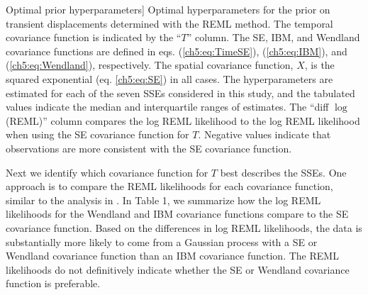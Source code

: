 \begin{table}\label{ch5:tab:Parameters}
\caption
[Optimal prior hyperparameters]
{Optimal hyperparameters for the prior on transient
displacements determined with the REML method. The temporal covariance
function is indicated by the ``$T$'' column. The SE, IBM, and Wendland
covariance functions are defined in eqs. (\ref{ch5:eq:TimeSE}),
(\ref{ch5:eq:IBM}), and (\ref{ch5:eq:Wendland}), respectively. The
spatial covariance function, $X$, is the squared exponential (eq.
\ref{ch5:eq:SE}) in all cases. The hyperparameters are estimated for
each of the seven SSEs considered in this study, and the tabulated
values indicate the median and interquartile ranges of estimates. The
``diff $\log$(REML)'' column compares the log REML likelihood to the
log REML likelihood when using the SE covariance function for $T$.
Negative values indicate that observations are more consistent with
the SE covariance function.}
\end{table}

Next we identify which covariance function for $T$ best describes the
SSEs. One approach is to compare the REML likelihoods for each
covariance function, similar to the analysis in \citet{Langbein2004}.
In Table 1, we summarize how the log REML likelihoods for the Wendland
and IBM covariance functions compare to the SE covariance function.
Based on the differences in log REML likelihoods, the data is
substantially more likely to come from a Gaussian process with a SE or
Wendland covariance function than an IBM covariance function. The REML
likelihoods do not definitively indicate whether the SE or Wendland
covariance function is preferable.

